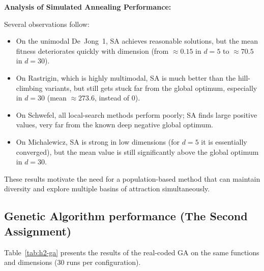\documentclass[a4paper,11pt]{article}
\begin{document}
\vspace{2em}

\noindent\textbf{Analysis of Simulated Annealing Performance:}

\vspace{0.5em}

Several observations follow:
\begin{itemize}
  \item On the unimodal De~Jong~1, SA achieves reasonable solutions, but the mean
        fitness deteriorates quickly with dimension (from $\approx 0.15$ in $d=5$
        to $\approx 70.5$ in $d=30$).
  \item On Rastrigin, which is highly multimodal, SA is much better than the
        hill-climbing variants, but still gets stuck far from the global optimum,
        especially in $d=30$ (mean $\approx 273.6$, instead of $0$).
  \item On Schwefel, all local-search methods perform poorly; SA finds large
        positive values, very far from the known deep negative global optimum.
  \item On Michalewicz, SA is strong in low dimensions (for $d=5$ it is
        essentially converged), but the mean value is still significantly
        above the global optimum in $d=30$.
\end{itemize}

These results motivate the need for a population-based method that can maintain
diversity and explore multiple basins of attraction simultaneously.

\clearpage
\subsection{Genetic Algorithm performance (The Second Assignment)}

\vspace{1em}

Table~\ref{tab:h2-ga} presents the results of the real-coded GA on the same
functions and dimensions (30 runs per configuration).

\vspace{1.5em}
\end{document}

